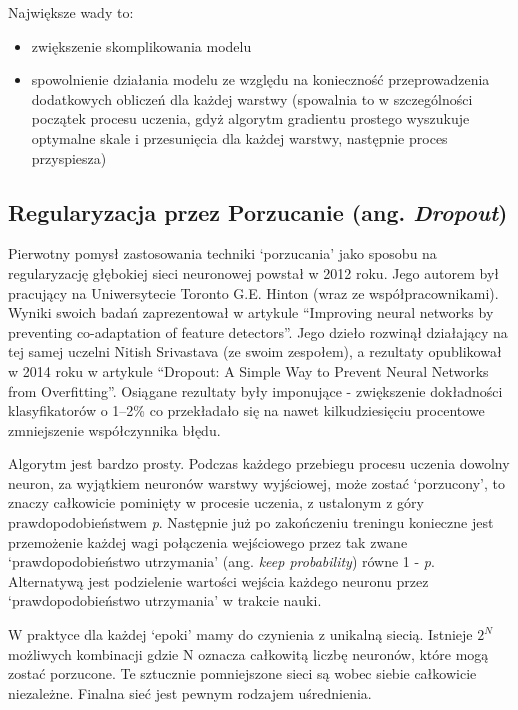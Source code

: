 \documentclass[a4paper,11pt]{article}
\begin{document}
    \bigskip

    Największe wady to\cite{UczenieMaszynowe2018}:
    \begin{itemize}
        \item zwiększenie skomplikowania modelu
        \item spowolnienie działania modelu ze względu na konieczność przeprowadzenia dodatkowych obliczeń dla każdej warstwy (spowalnia to w szczególności początek procesu uczenia, gdyż algorytm gradientu prostego wyszukuje optymalne skale i przesunięcia dla każdej warstwy, następnie proces przyspiesza)
    \end{itemize}

    \subsection{Regularyzacja przez Porzucanie (ang. \textit{Dropout})}

    Pierwotny pomysł zastosowania techniki `porzucania' jako sposobu na regularyzację głębokiej sieci neuronowej powstał w 2012 roku. Jego autorem był pracujący na Uniwersytecie Toronto G.E. Hinton (wraz ze współpracownikami). Wyniki swoich badań zaprezentował w artykule ``Improving neural networks by preventing co-adaptation of feature detectors''\cite{ImprovingNeuralNetworks2012}. Jego dzieło rozwinął działający na tej samej uczelni Nitish Srivastava (ze swoim zespołem), a rezultaty opublikował w 2014 roku w artykule ``Dropout: A Simple Way to Prevent Neural Networks from Overfitting''\cite{Dropout2014}. Osiągane rezultaty były imponujące - zwiększenie dokładności klasyfikatorów o 1--2\% co przekładało się na nawet kilkudziesięciu procentowe zmniejszenie współczynnika błędu.

    \bigskip

    Algorytm jest bardzo prosty. Podczas każdego przebiegu procesu uczenia dowolny neuron, za wyjątkiem neuronów warstwy wyjściowej, może zostać `porzucony', to znaczy całkowicie pominięty w procesie uczenia, z ustalonym z góry prawdopodobieństwem \textit{p}. Następnie już po zakończeniu treningu konieczne jest przemożenie każdej wagi połączenia wejściowego przez tak zwane `prawdopodobieństwo utrzymania' (ang. \textit{keep probability}) równe 1 - \textit{p}. Alternatywą jest podzielenie wartości wejścia każdego neuronu przez `prawdopodobieństwo utrzymania' w trakcie nauki\cite{UczenieMaszynowe2018}.

    \bigskip

    W praktyce dla każdej `epoki' mamy do czynienia z unikalną siecią. Istnieje $2^{N}$ możliwych kombinacji gdzie N oznacza całkowitą liczbę neuronów, które mogą zostać porzucone. Te sztucznie pomniejszone sieci są wobec siebie całkowicie niezależne. Finalna sieć jest pewnym rodzajem uśrednienia\cite{UczenieMaszynowe2018}.
\end{document}
